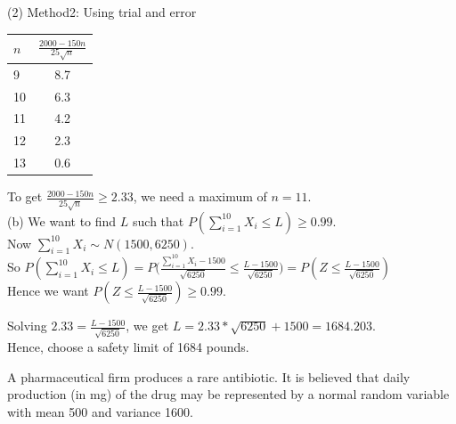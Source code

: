 \documentclass[bigtut]{tutorial}\usepackage[]{graphicx}\usepackage[]{color}
\begin{document}
\begin{tutorial}
\begin{questions}
\begin{solution}
(2) Method2: Using trial and error \\

\begin{tabular}{|l|c|} \hline
$n$ & $\frac{2000 - 150n}{25\sqrt{n}}$ \\ \hline
9 &  8.7 \\
10 & 6.3 \\
11 &  4.2 \\
12 & 2.3 \\
13 & 0.6 \\ \hline
\end{tabular}

\vspace{.2cm}
To get $\frac{2000 - 150n}{25\sqrt{n}} \geq 2.33$, we need a maximum of $n =11$. \\


(b) 
We want to find $L$ such that $P(\sum_{i=1}^{10} X_{i} \leq L) \geq 0.99$. \\

Now $\sum_{i=1}^{10} X_{i} \sim N( 1500, 6250)$. \\

So $P( \sum_{i=1}^{10} X_{i} \leq L)  = P \big( \frac{
\sum_{i=1}^{10} X_{i} - 1500}{\sqrt{6250}} \leq \frac{
L - 1500}{\sqrt{6250}} \big) = P(Z \leq \frac{
L - 1500}{\sqrt{6250}} ) $ \\

Hence we want $P(Z \leq \frac{
L - 1500}{\sqrt{6250}} )  \geq 0.99$.

Solving $2.33 = \frac{
L - 1500}{\sqrt{6250}}$, we get
$L = 2.33*\sqrt{6250} + 1500 = 1684.203$. \\
Hence, choose a safety limit of 1684 pounds.
\end{solution}

\question A pharmaceutical firm produces a rare antibiotic. It is believed that
daily production (in mg) of the drug may be represented by a normal random
variable with mean 500 and variance 1600.  \\

\end{questions}
\end{tutorial}
\end{document}
